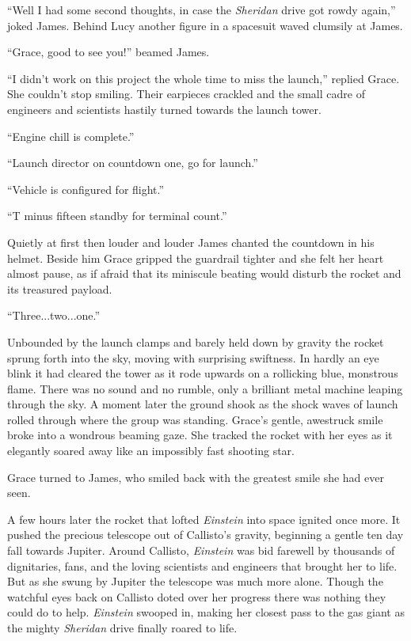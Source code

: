 \documentclass[12pt]{article} %
\begin{document}
``Well I had some second thoughts, in case the \textit{Sheridan} drive got rowdy again,'' joked James. Behind Lucy another figure in a spacesuit waved clumsily at James.

``Grace, good to see you!'' beamed James.

``I didn't work on this project the whole time to miss the launch,'' replied Grace. She couldn't stop smiling. Their earpieces crackled and the small cadre of engineers and scientists hastily turned towards the launch tower.

``Engine chill is complete.''

``Launch director on countdown one, go for launch.''

``Vehicle is configured for flight.''

``T minus fifteen standby for terminal count.''

Quietly at first then louder and louder James chanted the countdown in his helmet. Beside him Grace gripped the guardrail tighter and she felt her heart almost pause, as if afraid that its miniscule beating would disturb the rocket and its treasured payload.

``Three...two...one.''

Unbounded by the launch clamps and barely held down by gravity the rocket sprung forth into the sky, moving with surprising swiftness. In hardly an eye blink it had cleared the tower as it rode upwards on a rollicking blue, monstrous flame. There was no sound and no rumble, only a brilliant metal machine leaping through the sky. A moment later the ground shook as the shock waves of launch rolled through where the group was standing. Grace's gentle, awestruck smile broke into a wondrous beaming gaze. She tracked the rocket with her eyes as it elegantly soared away like an impossibly fast shooting star.

Grace turned to James, who smiled back with the greatest smile she had ever seen.

A few hours later the rocket that lofted \textit{Einstein} into space ignited once more. It pushed the precious telescope out of Callisto's gravity, beginning a gentle ten day fall towards Jupiter. Around Callisto, \textit{Einstein} was bid farewell by thousands of dignitaries, fans, and the loving scientists and engineers that brought her to life. But as she swung by Jupiter the telescope was much more alone. Though the watchful eyes back on Callisto doted over her progress there was nothing they could do to help. \textit{Einstein} swooped in, making her closest pass to the gas giant as the mighty \textit{Sheridan} drive finally roared to life.
\end{document}
